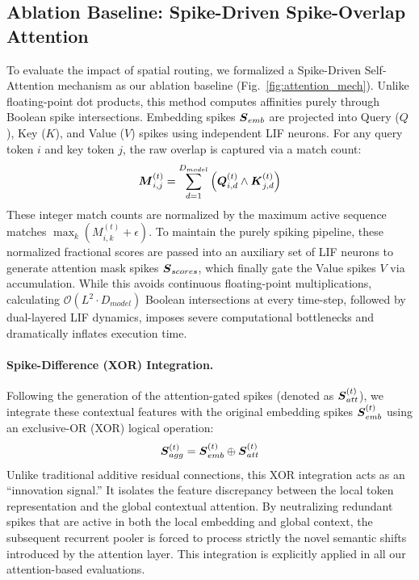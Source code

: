 \documentclass[runningheads]{llncs}
\begin{document}
\subsection{Ablation Baseline: Spike-Driven Spike-Overlap Attention}
To evaluate the impact of spatial routing, we formalized a Spike-Driven Self-Attention mechanism as our ablation baseline (Fig.~\ref{fig:attention_mech}). Unlike floating-point dot products, this method computes affinities purely through Boolean spike intersections. Embedding spikes $\boldsymbol{S}_{emb}$ are projected into Query ($Q$), Key ($K$), and Value ($V$) spikes using independent LIF neurons. For any query token $i$ and key token $j$, the raw overlap is captured via a match count:
\begin{equation}
\boldsymbol{M}_{i,j}^{(t)} = \sum_{d=1}^{D_{model}} \left( \boldsymbol{Q}_{i,d}^{(t)} \wedge \boldsymbol{K}_{j,d}^{(t)} \right)
\end{equation}
These integer match counts are normalized by the maximum active sequence matches $\max_k (M_{i,k}^{(t)} + \epsilon)$. To maintain the purely spiking pipeline, these normalized fractional scores are passed into an auxiliary set of LIF neurons to generate attention mask spikes $\boldsymbol{S}_{scores}$, which finally gate the Value spikes $V$ via accumulation. While this avoids continuous floating-point multiplications, calculating $\mathcal{O}(L^2 \cdot D_{model})$ Boolean intersections at every time-step, followed by dual-layered LIF dynamics, imposes severe computational bottlenecks and dramatically inflates execution time.

\paragraph{Spike-Difference (XOR) Integration.} Following the generation of the attention-gated spikes (denoted as $\boldsymbol{S}_{att}^{(t)}$), we integrate these contextual features with the original embedding spikes $\boldsymbol{S}_{emb}^{(t)}$ using an exclusive-OR (XOR) logical operation:
\begin{equation}
\boldsymbol{S}_{agg}^{(t)} = \boldsymbol{S}_{emb}^{(t)} \oplus \boldsymbol{S}_{att}^{(t)}
\end{equation}
Unlike traditional additive residual connections, this XOR integration acts as an ``innovation signal.'' It isolates the feature discrepancy between the local token representation and the global contextual attention. By neutralizing redundant spikes that are active in both the local embedding and global context, the subsequent recurrent pooler is forced to process strictly the novel semantic shifts introduced by the attention layer. This integration is explicitly applied in all our attention-based evaluations.
\end{document}
